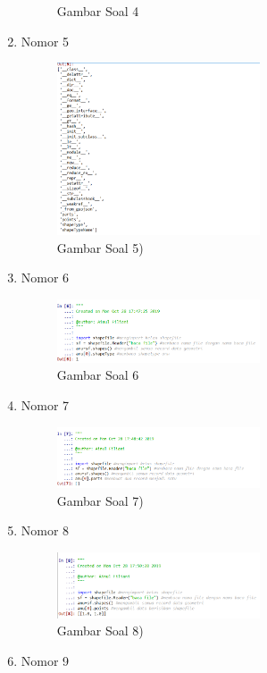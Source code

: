 \begin{enumerate}
\begin{figure}[H]
  \centering
  \caption{Gambar Soal 4}
 \end{figure}
 \item Nomor 5
 
 \begin{figure}[H]
  \includegraphics[width=6cm]{figures/Tugas3/1174073/no5.png}
  \centering
  \caption{Gambar Soal 5)}
 \end{figure}
 \item Nomor 6
 
 \begin{figure}[H]
  \includegraphics[width=6cm]{figures/Tugas3/1174073/no6.png}
  \centering
  \caption{Gambar Soal 6}
 \end{figure}
 \item Nomor 7
 
 \begin{figure}[H]
  \includegraphics[width=6cm]{figures/Tugas3/1174073/no7.png}
  \centering
  \caption{Gambar Soal 7)}
 \end{figure}
 \item Nomor 8
 
 \begin{figure}[H]
  \includegraphics[width=6cm]{figures/Tugas3/1174073/no8.png}
  \centering
  \caption{Gambar Soal 8)}
 \end{figure}
 \item Nomor 9

\end{enumerate}
